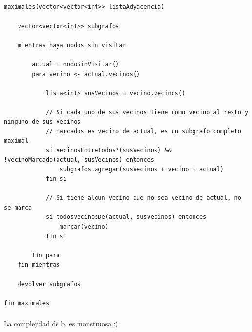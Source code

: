 \subsection{}

\setcounter{subsubsection}{1}
\subsubsection{}

\begin{codesnippet}
\begin{verbatim}
maximales(vector<vector<int>> listaAdyacencia)

    vector<vector<int>> subgrafos

    mientras haya nodos sin visitar

        actual = nodoSinVisitar()
        para vecino <- actual.vecinos()

            lista<int> susVecinos = vecino.vecinos()

            // Si cada uno de sus vecinos tiene como vecino al resto y ninguno de sus vecinos 
            // marcados es vecino de actual, es un subgrafo completo maximal
            si vecinosEntreTodos?(susVecinos) && !vecinoMarcado(actual, susVecinos) entonces
                subgrafos.agregar(susVecinos + vecino + actual)
            fin si

            // Si tiene algun vecino que no sea vecino de actual, no se marca
            si todosVecinosDe(actual, susVecinos) entonces
                marcar(vecino)
            fin si

        fin para
    fin mientras

    devolver subgrafos

fin maximales
\end{verbatim}
\end{codesnippet}

\subsubsection{}
La complejidad de b. es monstruosa :)